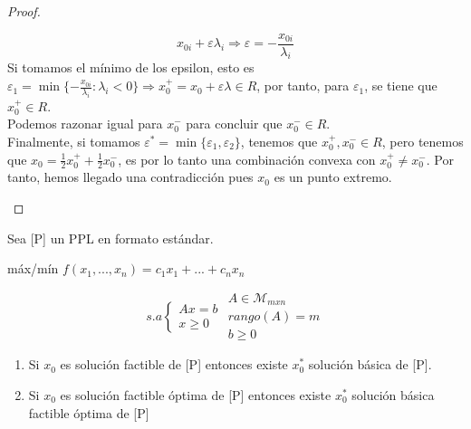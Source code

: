 \documentclass[11pt,fleqn]{book} %
\begin{document}
\begin{proof}
\begin{enumerate}
	$$
	x_{0i}+\varepsilon\lambda_i\Rightarrow\varepsilon=-\frac{x_{0i}}{\lambda_i}
	$$
	Si tomamos el mínimo de los epsilon, esto es $\varepsilon_1=\min\{-\frac{x_{0i}}{\lambda_i} : \lambda_i < 0\} \Rightarrow x_0^+=x_0+\varepsilon \lambda \in R$, por tanto, para $\varepsilon_1$, se tiene que $x_0^+ \in R$. \\
	Podemos razonar igual para $x_0^-$ para concluir que $x_0^- \in R$.\\
	Finalmente, si tomamos $\varepsilon^*=\min\{\varepsilon_1, \varepsilon_2\}$, tenemos que $x_0^+, x_0^- \in R$, pero tenemos que $x_0=\frac{1}{2}x_0^++\frac{1}{2}x_0^-$, es por lo tanto una combinación convexa con $x_0^+ \neq x_0^-$. Por tanto, hemos llegado una contradicción pues $x_0$ es un punto extremo.
  \end{enumerate}
\end{proof}
\begin{theorem}
  Sea [P] un PPL en formato estándar.
  \begin{center}
	máx/mín $f(x_1, ..., x_n)=c_1x_1+...+c_nx_n$
  \end{center}
  $$
  s.a \left\{ \begin{array}{c}
	Ax=b \\
	x\geq0
  \end{array}\right.
  \begin{array}{c}
	A\in \mathcal{M}_{mxn}\\
	rango(A)=m\\
	b\geq 0
  \end{array}
  $$
  \begin{enumerate}
  \item Si $x_0$ es solución factible de [P] entonces existe $x_0^*$ solución básica de [P].
  \item Si $x_0$ es solución factible óptima de [P] entonces existe $x_0^*$ solución básica factible óptima de [P]
  \end{enumerate}
\end{theorem}
\end{document}
